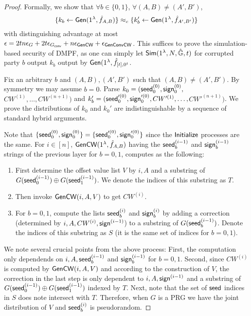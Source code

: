 \begin{proof}
    Formally, we show that $\forall b\in\{0,1\}$, $\forall (A,B)\not=(A',B')$, 
    \[
        \begin{split}
            \{k_b\gets {\sf Gen}(1^\lambda, \hat{f}_{A,B})\}\approx_c\{k_b'\gets{\sf Gen}(1^\lambda, \hat{f}_{A',B'})\}
        \end{split}
    \]
    with distinguishing advantage at most $\epsilon = 2tn\epsilon_{G}+2t \epsilon_{G_{\sf conv}}+n\epsilon_{{\sf Gen}{\sf CW}} +\epsilon_{{\sf Gen}{\sf Conv}{\sf CW}}$. This suffices to prove the simulation-based security of DMPF, as one can simply let ${\sf Sim}(1^\lambda, N,\hat{\mathbb{G}},t)$ for corrupted party $b$ output $k_b$ output by ${\sf Gen}(1^\lambda, \hat{f}_{[t],0^t}$. 
    
    Fix an arbitrary $b$ and $(A,B), (A',B')$ such that $(A,B)\not=(A',B')$. By symmetry we may assume $b=0$. 
    Parse $k_0 = ({\sf seed}_0^{(0)}, {\sf sign}_0^{(0)}, $\linebreak$CW^{(1)},\dots,CW^{(n+1)})$ and $k_b' = ({\sf seed}_0'^{(0)}, {\sf sign}_0'^{(0)}, CW'^{(1)},\dots,$\linebreak$CW'^{(n+1)})$. We prove the distributions of $k_0$ and $k_0'$ are indistinguishable by a sequence of standard hybrid arguments. 


    Note that $\{{\sf seed}_0^{(0)}, {\sf sign}_0^{(0)}\} = \{{\sf seed}_0'^{(0)}, {\sf sign}_0'^{(0)}\}$ since the \linebreak$\sf Initialize$ processes are the same. For $i\in[n]$, ${\sf Gen}{\sf CW}(1^\lambda, \hat{f}_{A,B})$ having the ${\sf seed}_b^{(i-1)}$ and ${\sf sign}_b^{(i-1)}$ strings of the previous layer for $b=0,1$, computes as the following: 
    \begin{enumerate}
        \item First determine the offset value list $V$ by $i, A$ and a substring of $G({\sf seed}_0^{(i-1)})\oplus G({\sf seed}_1^{(i-1)})$. We denote the indices of this substring as $T$. 
        \item Then invoke ${\sf Gen}{\sf CW}(i,A,V)$ to get $CW^{(i)}$. 
        \item For $b=0,1$, compute the lists ${\sf seed}_b^{(i)}$ and ${\sf sign}_b^{(i)}$ by adding a correction (determined by $i,A,CW^{(i)}, {\sf sign}^{(i-1)}$) to a substring of $G({\sf seed}_b^{(i-1)})$. Denote the indices of this substring as $S$ (it is the same set of indices for $b=0,1$). 
    \end{enumerate}
    We note several crucial points from the above process: First, the computation only dependends on $i,A,{\sf seed}_b^{(i-1)}$ and ${\sf sign}_b^{(i-1)}$ for $b=0,1$. Second, since $CW^{(i)}$ is computed by ${\sf Gen}{\sf CW}(i,A,V)$ and according to the construction of $V$, the correction in the last step is only dependent to $i, A, {\sf sign}^{(i-1)}$ and a substring of $G({\sf seed}_0^{(i-1)})\oplus G({\sf seed}_1^{(i-1)})$ indexed by $T$. Next, note that the set of ${\sf seed}$ indices in $S$ does note intersect with $T$. Therefore, when $G$ is a PRG we have the joint distribution of $V$ and ${\sf seed}_b^{(i)}$ is pseudorandom. 
    

\end{proof}
